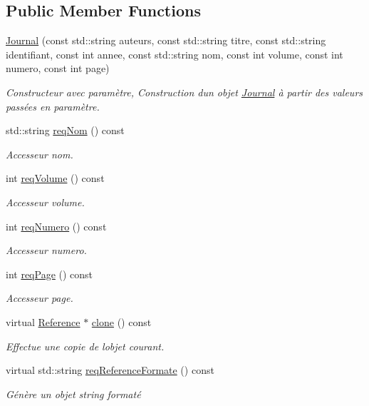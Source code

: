 \subsection*{Public Member Functions}
\begin{DoxyCompactItemize}
\item 
\hyperlink{classbiblio_1_1Journal_aaf2c55acfecdf018f12e484f371db1ea}{Journal} (const std\+::string auteurs, const std\+::string titre, const std\+::string identifiant, const int annee, const std\+::string nom, const int volume, const int numero, const int page)
\begin{DoxyCompactList}\small\item\em Constructeur avec paramètre, Construction d\textquotesingle{}un objet \hyperlink{classbiblio_1_1Journal}{Journal} à partir des valeurs passées en paramètre. \end{DoxyCompactList}\item 
std\+::string \hyperlink{classbiblio_1_1Journal_aa139f1044819c85541473ec36a9fa311}{req\+Nom} () const
\begin{DoxyCompactList}\small\item\em Accesseur nom. \end{DoxyCompactList}\item 
int \hyperlink{classbiblio_1_1Journal_a531b7b5c9b2a751c5cc13708bd162686}{req\+Volume} () const
\begin{DoxyCompactList}\small\item\em Accesseur volume. \end{DoxyCompactList}\item 
int \hyperlink{classbiblio_1_1Journal_a28a30747554b750a73a2e244d7df362c}{req\+Numero} () const
\begin{DoxyCompactList}\small\item\em Accesseur numero. \end{DoxyCompactList}\item 
int \hyperlink{classbiblio_1_1Journal_a4851c5abea5315d7c666b7ce11af8794}{req\+Page} () const
\begin{DoxyCompactList}\small\item\em Accesseur page. \end{DoxyCompactList}\item 
virtual \hyperlink{classbiblio_1_1Reference}{Reference} $\ast$ \hyperlink{classbiblio_1_1Journal_a345f003e80ad8fdc9dd1a975b9139d4f}{clone} () const
\begin{DoxyCompactList}\small\item\em Effectue une copie de l\textquotesingle{}objet courant. \end{DoxyCompactList}\item 
virtual std\+::string \hyperlink{classbiblio_1_1Journal_a5234b1ab18da0a93d14d2319d6ccb8b2}{req\+Reference\+Formate} () const
\begin{DoxyCompactList}\small\item\em Génère un objet string formaté \end{DoxyCompactList}\end{DoxyCompactItemize}
